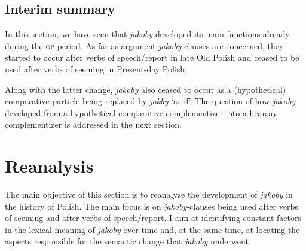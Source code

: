 \documentclass[output=paper
,modfonts
,nonflat]{langsci/langscibook}
\begin{document}
\subsection{Interim summary}

In this section, we have seen that \emph{jakoby} developed its main functions already during the \textsc{op} period. As far as argument \emph{jakoby}-clauses are concerned, they started to occur after verbs of speech\slash report in late Old Polish and ceased to be used after verbs of seeming in Present-day Polish:

\begin{table}[h]
\caption{The development of \emph{jakoby}-argument clauses in the history of Polish}
\end{table}

\noindent Along with the latter change, \emph{jakoby} also ceased to occur as a (hypothetical) comparative particle being replaced by \emph{jakby} `as if'. The question of how \emph{jakoby} developed from a hypothetical comparative complementizer into a hearsay complementizer is addressed in the next section.

\section{Reanalysis}

The main objective of this section is to reanalyze the development of \emph{jakoby} in the history of Polish. The main focus is on \emph{jakoby}-clauses being used after verbs of seeming and after verbs of speech\slash report. I aim at identifying constant factors in the lexical meaning of \emph{jakoby} over time and, at the same time, at locating the aspects responsible for the semantic change that \emph{jakoby} underwent.
\end{document}
